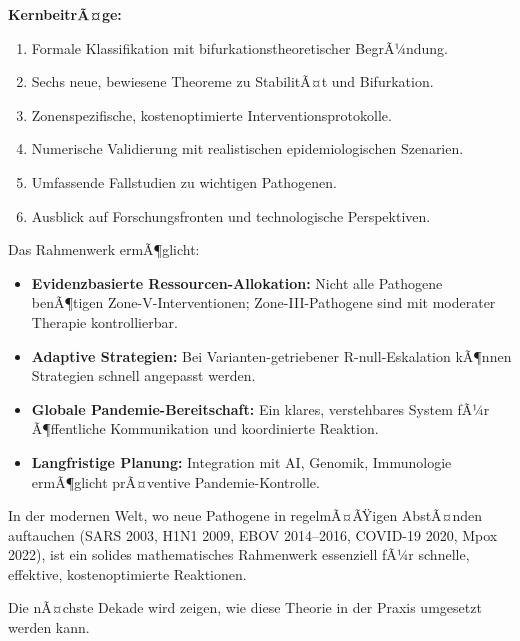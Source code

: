 ﻿\documentclass[a4paper,12pt,twoside]{article}
\theoremstyle{definition}
\begin{document}
\textbf{KernbeitrÃ¤ge:}

\begin{enumerate}
\item Formale Klassifikation mit bifurkationstheoretischer BegrÃ¼ndung.
\item Sechs neue, bewiesene Theoreme zu StabilitÃ¤t und Bifurkation.
\item Zonenspezifische, kostenoptimierte Interventionsprotokolle.
\item Numerische Validierung mit realistischen epidemiologischen Szenarien.
\item Umfassende Fallstudien zu wichtigen Pathogenen.
\item Ausblick auf Forschungsfronten und technologische Perspektiven.
\end{enumerate}

Das Rahmenwerk ermÃ¶glicht:

\begin{itemize}
\item \textbf{Evidenzbasierte Ressourcen-Allokation:} Nicht alle Pathogene benÃ¶tigen Zone-V-Interventionen; Zone-III-Pathogene sind mit moderater Therapie kontrollierbar.
\item \textbf{Adaptive Strategien:} Bei Varianten-getriebener R-null-Eskalation kÃ¶nnen Strategien schnell angepasst werden.
\item \textbf{Globale Pandemie-Bereitschaft:} Ein klares, verstehbares System fÃ¼r Ã¶ffentliche Kommunikation und koordinierte Reaktion.
\item \textbf{Langfristige Planung:} Integration mit AI, Genomik, Immunologie ermÃ¶glicht prÃ¤ventive Pandemie-Kontrolle.
\end{itemize}

In der modernen Welt, wo neue Pathogene in regelmÃ¤ÃŸigen AbstÃ¤nden auftauchen (SARS 2003, H1N1 2009, EBOV 2014--2016, COVID-19 2020, Mpox 2022), ist ein solides mathematisches Rahmenwerk essenziell fÃ¼r schnelle, effektive, kostenoptimierte Reaktionen.

Die nÃ¤chste Dekade wird zeigen, wie diese Theorie in der Praxis umgesetzt werden kann.

\newpage
\end{document}
